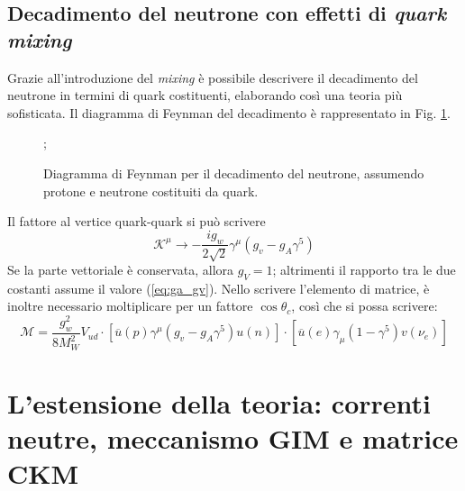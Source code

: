 \documentclass{subnucbo}
\begin{document}
\subsection{Decadimento del neutrone con effetti di \textit{quark mixing}}
Grazie all'introduzione del \textit{mixing} è possibile descrivere il decadimento del neutrone in termini di quark costituenti, elaborando così una teoria più sofisticata. Il diagramma di Feynman del decadimento è rappresentato in Fig. \ref{fig:neutron_decay_quarks}.
\begin{figure}[!h]
        \centering
        ;
        \caption{Diagramma di Feynman per il decadimento del neutrone, assumendo protone e neutrone costituiti da quark.}
        \label{fig:neutron_decay_quarks}
\end{figure}
Il fattore al vertice quark-quark si può scrivere
\begin{equation}
        \mathcal { K } ^ { \mu } \rightarrow - \frac { i g _ { w } } { 2 \sqrt { 2 } } \gamma ^ { \mu } \left( g _ { v } - g _ { A } \gamma ^ { 5 } \right)
\end{equation}
Se la parte vettoriale è conservata, allora $g_{V} = 1$; altrimenti il rapporto tra le due costanti assume il valore (\ref{eq:ga_gv}). Nello scrivere l'elemento di matrice, è inoltre necessario moltiplicare per un fattore $\cos\theta_{c}$, così che si possa scrivere:
\begin{equation}
        \mathcal { M } = \frac { g _ { w } ^ { 2 } } { 8 M _ { W } ^ { 2 } } V _ { u d } \cdot \left[ \overline { u } ( p ) \gamma ^ { \mu } \left( g _ { v } - g _ { A } \gamma ^ { 5 } \right) u ( n ) \right] \cdot \left[ \overline { u } ( e ) \gamma _ { \mu } \left( 1 - \gamma ^ { 5 } \right) v \left( \nu _ { e } \right) \right]
\end{equation}
\section{L'estensione della teoria: correnti neutre, meccanismo GIM e matrice CKM}
\end{document}
